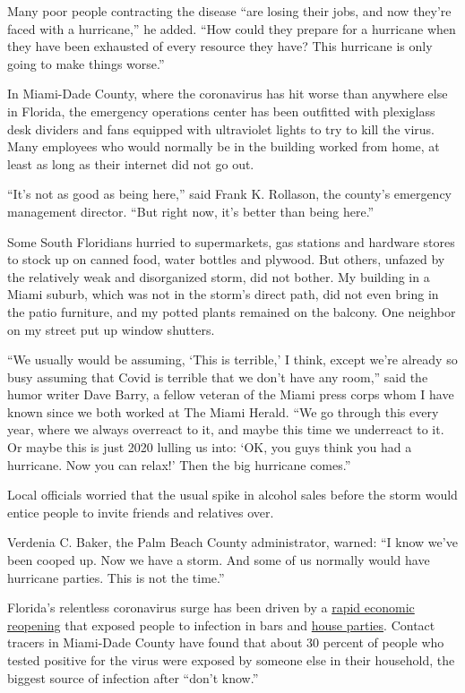 Many poor people contracting the disease ``are losing their jobs, and
now they're faced with a hurricane,'' he added. ``How could they prepare
for a hurricane when they have been exhausted of every resource they
have? This hurricane is only going to make things worse.''

In Miami-Dade County, where the coronavirus has hit worse than anywhere
else in Florida, the emergency operations center has been outfitted with
plexiglass desk dividers and fans equipped with ultraviolet lights to
try to kill the virus. Many employees who would normally be in the
building worked from home, at least as long as their internet did not go
out.

``It's not as good as being here,'' said Frank K. Rollason, the county's
emergency management director. ``But right now, it's better than being
here.''

Some South Floridians hurried to supermarkets, gas stations and hardware
stores to stock up on canned food, water bottles and plywood. But
others, unfazed by the relatively weak and disorganized storm, did not
bother. My building in a Miami suburb, which was not in the storm's
direct path, did not even bring in the patio furniture, and my potted
plants remained on the balcony. One neighbor on my street put up window
shutters.

``We usually would be assuming, `This is terrible,' I think, except
we're already so busy assuming that Covid is terrible that we don't have
any room,'' said the humor writer Dave Barry, a fellow veteran of the
Miami press corps whom I have known since we both worked at The Miami
Herald. ``We go through this every year, where we always overreact to
it, and maybe this time we underreact to it. Or maybe this is just 2020
lulling us into: `OK, you guys think you had a hurricane. Now you can
relax!' Then the big hurricane comes.''

Local officials worried that the usual spike in alcohol sales before the
storm would entice people to invite friends and relatives over.

Verdenia C. Baker, the Palm Beach County administrator, warned: ``I know
we've been cooped up. Now we have a storm. And some of us normally would
have hurricane parties. This is not the time.''

Florida's relentless coronavirus surge has been driven by a
\href{https://www.nytimes3xbfgragh.onion/2020/06/26/us/coronavirus-florida-texas-bars-closing.html}{rapid
economic reopening} that exposed people to infection in bars and
\href{https://www.nytimes3xbfgragh.onion/2020/07/06/us/coronavirus-florida-miami.html}{house
parties}. Contact tracers in Miami-Dade County have found that about 30
percent of people who tested positive for the virus were exposed by
someone else in their household, the biggest source of infection after
``don't know.''

